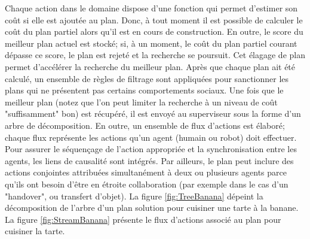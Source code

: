 \documentclass[a4paper,11pt,twoside]{StyleThese}
\begin{document}




Chaque action dans le domaine dispose d'une fonction qui permet d'estimer son coût si elle est ajoutée au plan. Donc, à tout moment il est possible de calculer le coût du plan partiel alors qu'il est en cours de construction. En outre, le score du meilleur plan actuel est stocké; si, à un moment, le coût du plan partiel courant dépasse ce score, le plan est rejeté et la recherche se poursuit. Cet élagage de plan permet d'accélérer la recherche du meilleur plan. Après que chaque plan ait été calculé, un ensemble de règles de filtrage sont appliquées pour sanctionner les plans qui ne présentent pas certains comportements sociaux. Une fois que le meilleur plan (notez que l'on peut limiter la recherche à un niveau de coût "suffisamment" bon) est récupéré, il est envoyé au superviseur sous la forme d'un arbre de décomposition. En outre, un ensemble de flux d'actions est élaboré; chaque flux représente les actions qu'un agent (humain ou robot) doit effectuer. Pour assurer le séquençage de l'action appropriée et la synchronisation entre les agents, les liens de causalité sont intégrés. Par ailleurs, le plan peut inclure des actions conjointes attribuées simultanément à deux ou plusieurs agents parce qu'ils ont besoin d'être en étroite collaboration (par exemple dans le cas d'un "handover", ou transfert d'objet). La figure \ref{fig:TreeBanana}
dépeint la décomposition de l'arbre d'un plan solution pour cuisiner une tarte à la banane. La figure \ref{fig:StreamBanana} présente le flux d'actions associé au plan pour cuisiner la tarte.
 
\end{document}
